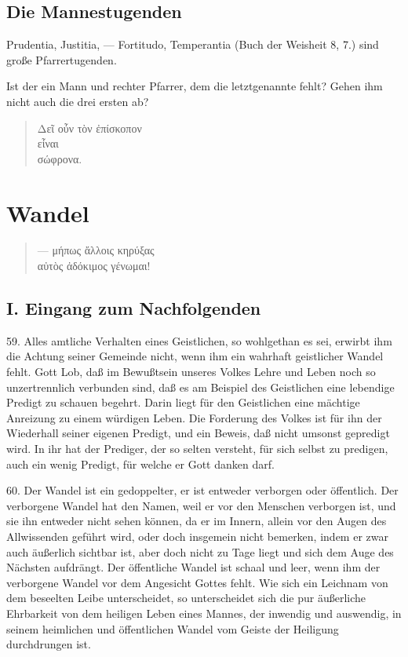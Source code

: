 \section{Die Mannestugenden}

Prudentia, Justitia, — Fortitudo, Temperantia (Buch der Weisheit 8, 7.) sind große Pfarrertugenden.

Ist der ein Mann und rechter Pfarrer, dem die letztgenannte fehlt? Gehen ihm nicht auch die drei ersten ab?

\begin{quote}
Δεῖ οὖν τὸν ἐπίσκοπον\\
εἶναι\\
σώφρονα.
\end{quote}


\chapter{Wandel}

\begin{quote}
— μήπως ἄλλοις κηρύξας\\
αὐτὸς ἀδόκιμος γένωμαι!
\end{quote}


\section{I. Eingang zum Nachfolgenden}

59. Alles amtliche Verhalten eines Geistlichen, so wohlgethan es sei, erwirbt ihm die Achtung seiner Gemeinde nicht, wenn ihm ein wahrhaft geistlicher Wandel fehlt. Gott Lob, daß im Bewußtsein unseres Volkes Lehre und Leben noch so unzertrennlich verbunden sind, daß es am Beispiel des Geistlichen eine lebendige Predigt zu schauen begehrt. Darin liegt für den Geistlichen eine mächtige Anreizung zu einem würdigen Leben. Die Forderung des Volkes ist für ihn der Wiederhall seiner eigenen Predigt, und ein Beweis, daß nicht umsonst gepredigt wird. In ihr hat der Prediger, der so selten versteht, für sich selbst zu predigen, auch ein wenig Predigt, für welche er Gott danken darf.

60. Der Wandel ist ein gedoppelter, er ist entweder verborgen oder öffentlich. Der verborgene Wandel hat den Namen, weil er vor den Menschen verborgen ist, und sie ihn entweder nicht sehen können, da er im Innern, allein vor den Augen des Allwissenden geführt wird, oder doch insgemein nicht bemerken, indem er zwar auch äußerlich sichtbar ist, aber doch nicht zu Tage liegt und
sich dem Auge des Nächsten aufdrängt. Der öffentliche Wandel ist schaal und leer, wenn ihm der verborgene Wandel vor dem Angesicht Gottes fehlt. Wie sich ein Leichnam von dem beseelten Leibe unterscheidet, so unterscheidet sich die pur äußerliche Ehrbarkeit von dem heiligen Leben eines Mannes, der inwendig und auswendig, in seinem heimlichen und öffentlichen Wandel vom Geiste der Heiligung durchdrungen ist.

